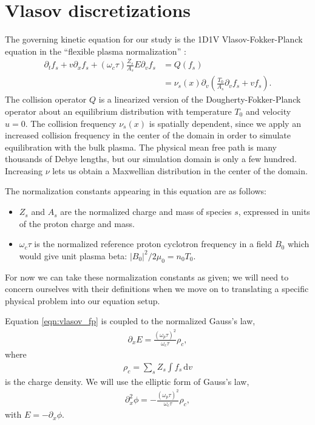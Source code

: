 \documentclass{article}
\begin{document}
\section{Vlasov discretizations}

The governing kinetic equation for our study is the 1D1V Vlasov-Fokker-Planck equation in
the ``flexible plasma normalization'' \cite{millerMultispecies13momentModel2016}:
\begin{align}
    \label{eqn:vlasov_fp}
    \partial_t f_s + v \partial_x f_s + (\omega_c \tau) \frac{Z_s}{A_s} E \partial_v f_s &= Q(f_s) \\
                                                                                         &= \nu_s(x) \partial_v \left( \frac{T_{0}}{A_s} \partial_v f_s + v f_s \right).
\end{align}
The collision operator $Q$ is a linearized version of the Dougherty-Fokker-Planck operator about an equilibrium
distribution with temperature $T_{0}$ and velocity $u = 0$.
The collision frequency $\nu_s(x)$ is spatially dependent, since we apply an increased collision frequency in the center of the domain
in order to simulate equilibration with the bulk plasma.
The physical mean free path is many thousands of Debye lengths, but our simulation domain is only a few hundred.
Increasing $\nu$ lets us obtain a Maxwellian distribution in the center of the domain.

The normalization constants appearing in this equation are as follows:
\begin{itemize}
    \item $Z_s$ and $A_s$ are the normalized charge and mass of species $s$, expressed in units of the proton charge and mass.
    \item $\omega_c \tau$ is the normalized reference proton cyclotron frequency in a field $B_0$ which would give unit plasma beta: $|B_0|^2 / 2 \mu_0 = n_0 T_0$.
\end{itemize}
For now we can take these normalization constants as given; we will need to concern ourselves with their definitions when we
move on to translating a specific physical problem into our equation setup.

Equation \eqref{eqn:vlasov_fp} is coupled to the normalized Gauss's law,
\begin{align}
\partial_x E = \frac{(\omega_p \tau)^2}{\omega_c \tau} \rho_c,
\end{align}
where
\begin{align}
    \rho_c = \sum_s Z_s \int f_s \,\mathrm{d} v
\end{align}
is the charge density.
We will use the elliptic form of Gauss's law,
\begin{align}
\partial_x^2 \phi = -\frac{(\omega_p \tau)^2}{\omega_c \tau} \rho_c,
\end{align}
with $E = -\partial_x \phi$.
\end{document}
